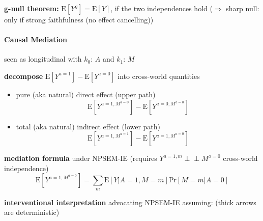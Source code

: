 \documentclass[8pt,twoside]{extarticle}
\newcommand{\indep}{\perp \!\!\! \perp}
\begin{document}
\begin{multicols}{2}
{\begin{minipage}{28em}
 \textbf{g-null theorem:} $\mathrm{E}\left[Y^g\right] = \mathrm{E}\left[Y\right]$, if the two independences hold \newline($\Rightarrow$ sharp null: only if strong faithfulness (no effect cancelling))

\end{minipage}}

\vspace{1.5em}

 \colorbox{lightgray!20!white}{\begin{minipage}{28em}

\paragraph{Causal Mediation} \citep{hernan2023causal}

  seen as longitudinal with  $k_0$: $A$ and $k_1$: $M$


\textbf{decompose} $\mathrm{E}\left[Y^{a=1}\right]  - \mathrm{E}\left[Y^{a=0}\right]$ into cross-world quantities
\begin{itemize}[itemsep=0em, topsep=0pt, partopsep=0pt,parsep=0pt, leftmargin=1.5em]
\item pure (aka natural) direct effect (upper path) $$\mathrm{E}\left[Y^{a=1, M^{a=0}}\right]  - \mathrm{E}\left[Y^{a=0, M^{a=0}}\right]$$
\item total (aka natural) indirect effect (lower path) $$\mathrm{E}\left[Y^{a=1, M^{a=1}}\right]  - \mathrm{E}\left[Y^{a=1, M^{a=0}}\right]$$
\end{itemize}

\textbf{mediation formula} under NPSEM-IE (requires $Y^{a=1,m} \indep M^{a=0}$ cross-world independence)
$$\mathrm{E}\left[Y^{a=1,M^{a=0}}\right] = \sum_m \mathrm{E}\left[Y|A=1, M=m\right]\mathrm{Pr}\left[M=m|A=0\right] $$


\textbf{interventional interpretation} advocating NPSEM-IE assuming:
(thick arrows are deterministic)


\end{minipage}}
\end{multicols}
\end{document}
